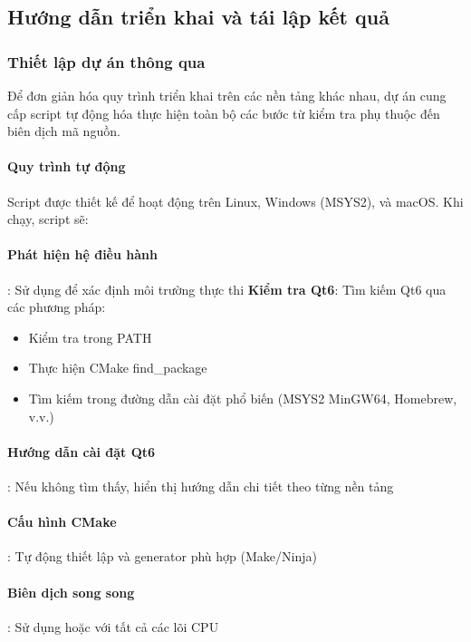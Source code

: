 \subsection{Hướng dẫn triển khai và tái lập kết quả}

\subsubsection{Thiết lập dự án thông qua }

Để đơn giản hóa quy trình triển khai trên các nền tảng khác nhau, dự án cung cấp script tự động hóa  thực hiện toàn bộ các bước từ kiểm tra phụ thuộc đến biên dịch mã nguồn.

\paragraph{Quy trình tự động}

Script  được thiết kế để hoạt động trên Linux, Windows (MSYS2), và macOS. Khi chạy, script sẽ:

\paragraph*{Phát hiện hệ điều hành}: Sử dụng  để xác định môi trường thực thi
\textbf{Kiểm tra Qt6}: Tìm kiếm Qt6 qua các phương pháp:
    \begin{itemize}
        \item Kiểm tra  trong PATH
        \item Thực hiện CMake find\_package
        \item Tìm kiếm trong đường dẫn cài đặt phổ biến (MSYS2 MinGW64, Homebrew, v.v.)
    \end{itemize}
\paragraph*{Hướng dẫn cài đặt Qt6}: Nếu không tìm thấy, hiển thị hướng dẫn chi tiết theo từng nền tảng
\paragraph*{Cấu hình CMake}: Tự động thiết lập  và generator phù hợp (Make/Ninja)
\paragraph*{Biên dịch song song}: Sử dụng  hoặc  với tất cả các lõi CPU
